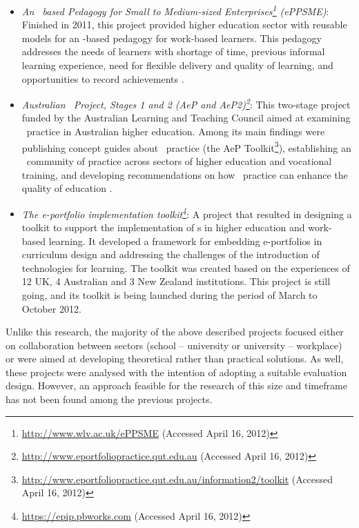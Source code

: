 \begin{itemize}
  \item \textit{An \ep~based Pedagogy for Small to Medium-sized
  Enterprises\footnote{\url{http://www.wlv.ac.uk/ePPSME} (Accessed April 16,
  2012)} (ePPSME)}: Finished in 2011, this project provided higher education sector with reusable models for an \ep-based pedagogy for work-based learners. This pedagogy addresses
  the needs of learners with shortage of time, previous informal learning
  experience, need for flexible delivery and quality of learning, and
  opportunities to record achievements \citep{Felce2011}.
  
  \item \textit{Australian \ep~Project, Stages 1 and 2 (AeP and
  AeP2)\footnote{\url{http://www.eportfoliopractice.qut.edu.au} (Accessed April
  16, 2012)}}: This two-stage project funded by the Australian Learning and
  Teaching Council aimed at examining \ep~practice in Australian higher
  education. Among its main findings were publishing concept guides about
  \ep~practice (the AeP
  Toolkit\footnote{\url{http://www.eportfoliopractice.qut.edu.au/information2/toolkit}
  (Accessed April 16, 2012)}), establishing an \ep~community of practice across
  sectors of higher education and vocational training, and developing
  recommendations on how \ep~practice can enhance the quality of education
  \citep{Hallam2008,Hallam2009}.
  
  \item \textit{The e-portfolio implementation
  toolkit\footnote{\url{https://epip.pbworks.com} (Accessed April 16, 2012)}}: A
  project that resulted in designing a toolkit to support the implementation of
  \ep s in higher education and work-based learning. It developed a framework
  for embedding e-portfolios in curriculum design and addressing the challenges
  of the introduction of technologies for learning. The toolkit was created
  based on the experiences of 12 UK, 4 Australian and 3 New Zealand
  institutions. This project is still going, and its toolkit is being launched
  during the period of March to October 2012.
\end{itemize}

Unlike this research, the majority of the above described projects focused
either on collaboration between sectors (school -- university or university --
workplace) or were aimed at developing theoretical rather than practical
solutions. As well, these projects were analysed with the intention of adopting
a suitable evaluation design. However, an approach feasible for the research of
this size and timeframe has not been found among the previous projects.

